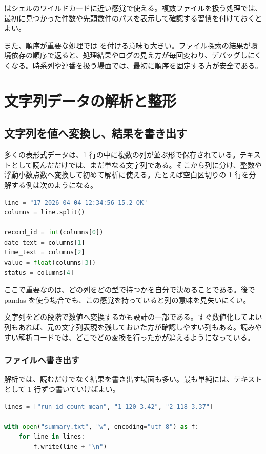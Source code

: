  はシェルのワイルドカードに近い感覚で使える。複数ファイルを扱う処理では、最初に見つかった件数や先頭数件のパスを表示して確認する習慣を付けておくとよい。

また、順序が重要な処理では  を付ける意味も大きい。ファイル探索の結果が環境依存の順序で返ると、処理結果やログの見え方が毎回変わり、デバッグしにくくなる。時系列や連番を扱う場面では、最初に順序を固定する方が安全である。

\section{文字列データの解析と整形}

\subsection{文字列を値へ変換し、結果を書き出す}

多くの表形式データは、1 行の中に複数の列が並ぶ形で保存されている。テキストとして読んだだけでは、まだ単なる文字列である。そこから列に分け、整数や浮動小数点数へ変換して初めて解析に使える。たとえば空白区切りの 1 行を分解する例は次のようになる。

\begin{lstlisting}[language=Python]
line = "17 2026-04-04 12:34:56 15.2 OK"
columns = line.split()

record_id = int(columns[0])
date_text = columns[1]
time_text = columns[2]
value = float(columns[3])
status = columns[4]
\end{lstlisting}

ここで重要なのは、どの列をどの型で持つかを自分で決めることである。後で pandas を使う場合でも、この感覚を持っていると列の意味を見失いにくい。

文字列をどの段階で数値へ変換するかも設計の一部である。すぐ数値化してよい列もあれば、元の文字列表現を残しておいた方が確認しやすい列もある。読みやすい解析コードでは、どこでどの変換を行ったかが追えるようになっている。

\subsubsection{ファイルへ書き出す}

解析では、読むだけでなく結果を書き出す場面も多い。最も単純には、テキストとして 1 行ずつ書いていけばよい。

\begin{lstlisting}[language=Python]
lines = ["run_id count mean", "1 120 3.42", "2 118 3.37"]

with open("summary.txt", "w", encoding="utf-8") as f:
    for line in lines:
        f.write(line + "\n")
\end{lstlisting}

